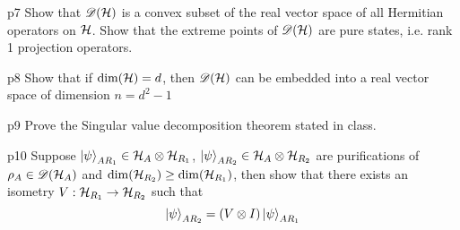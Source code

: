 \documentclass[a4paper, 11pt]{article}
\begin{document}

\begin{problem}{%
	}{p7%
	}
Show that ${\mathscr{D}}(\mathcal{H})$ is a convex subset of the real vector space of all Hermitian operators on $\mathcal{H}$. Show that the extreme points of ${\mathscr{D}}(\mathcal{H})$ are pure states, i.e.  rank 1 projection operators.
\end{problem}


\begin{problem}{%
	}{p8%
	}
Show that if $\dim(\mathcal{H})=d$, then ${\mathscr{D}}(\mathcal{H})$ can be embedded  into a real vector space  of dimension $n=d^2-1$
\end{problem}


\begin{problem}{%
	}{p9%
	}
Prove the Singular value decomposition theorem stated in class.	%
\end{problem}


\begin{problem}{%
	}{p10%
	}
	Suppose $\ket{\psi}_{AR_1}\in \mathcal{H}_{A}\otimes \mathcal{H}_{R_1}$, $\ket{\psi}_{AR_2}\in \mathcal{H}_A\otimes \mathcal{H}_{R_2}$ are purifications of  $\rho_A\in {\mathscr{D}}(\mathcal{H}_A)$ and $\dim(\mathcal{H}_{R_2})\geq \dim(\mathcal{H}_{R_1})$, then show that  there exists an isometry $V:\mathcal{H}_{R_1}\to \mathcal{H}_{R_2}$  such that $$\ket{\psi}_{AR_2}=(V\otimes I)\ket{\psi}_{AR_1}$$
\end{problem}
\end{document}
